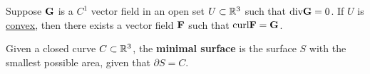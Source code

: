 \documentclass[11pt]{article}
\newcommand{\veF}[0]{\ve{F}}
\newcommand{\veG}[0]{\ve{G}}
\begin{document}
			\begin{theorem}
				Suppose $\veG$ is a $C^1$ vector field in an open set $U \subset \mathbb{R}^3$ such that $\dive \veG = 0$. If $U$ is \ul{convex}, then there exists a vector field $\veF$ such that $\curl \veF = \veG$.
			\end{theorem}
			
			\begin{definition}
				Given a closed curve $C \subset \mathbb{R}^3$, the \textbf{minimal surface} is the surface $S$ with the smallest possible area, given that $\partial S = C$.
			\end{definition}
\end{document}
